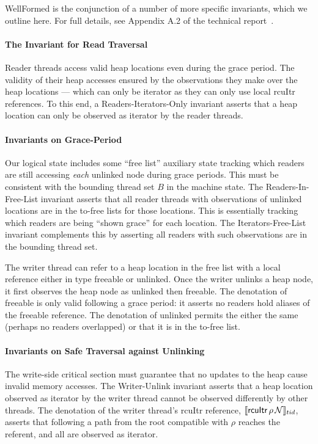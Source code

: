 \textsf{WellFormed} is the conjunction of a number of more specific invariants, which we outline here.
For full details, see Appendix A.2 of the technical report~\cite{isotek}.

\paragraph{The Invariant for Read Traversal} Reader threads access valid heap locations even during the grace period. The validity of their heap accesses ensured by the observations they make over the heap locations --- which can only be \textsf{iterator} as they can only use local \textsf{rcuItr} references. To this end, a \textsf{Readers-Iterators-Only} invariant asserts that a heap location can only be observed as \textsf{iterator} by the reader threads.
\paragraph{Invariants on Grace-Period}
Our logical state includes some ``free list'' auxiliary state tracking which readers are still accessing \emph{each} unlinked node during grace periods. This must be consistent with the bounding thread set $B$ in the machine state.
The \textsf{Readers-In-Free-List} invariant 
asserts that all reader threads with observations of unlinked locations are in the to-free lists for those locations.
This is essentially tracking which readers are being ``shown grace'' for each location.
The \textsf{Iterators-Free-List} invariant complements this by asserting all readers with such observations are in the bounding thread set.

The writer thread can refer to a heap location in the free list with a local reference either in type \textsf{freeable} or \textsf{unlinked}. Once the writer unlinks a heap node, it first observes the heap node as \textsf{unlinked} then \textsf{freeable}. The denotation of \textsf{freeable} is only valid following a grace period: it asserts no readers hold aliases of the \textsf{freeable} reference. The denotation of \textsf{unlinked} permits the either the same (perhaps no readers overlapped) 
or that it is in the to-free list.
\paragraph{Invariants on Safe Traversal against Unlinking}
The write-side critical section must guarantee that no updates to the heap cause invalid memory accesses. 
The \textsf{Writer-Unlink} invariant asserts that a heap location observed as \textsf{iterator} by the writer thread cannot be observed differently by other threads. The denotation of the writer thread's \textsf{rcuItr} reference, $\llbracket \mathsf{rcuItr}\,\rho \,\mathcal{N} \rrbracket_{tid}$, asserts that 
following a path from the root compatible with $\rho$ reaches the referent, and all are observed as \textsf{iterator}.

